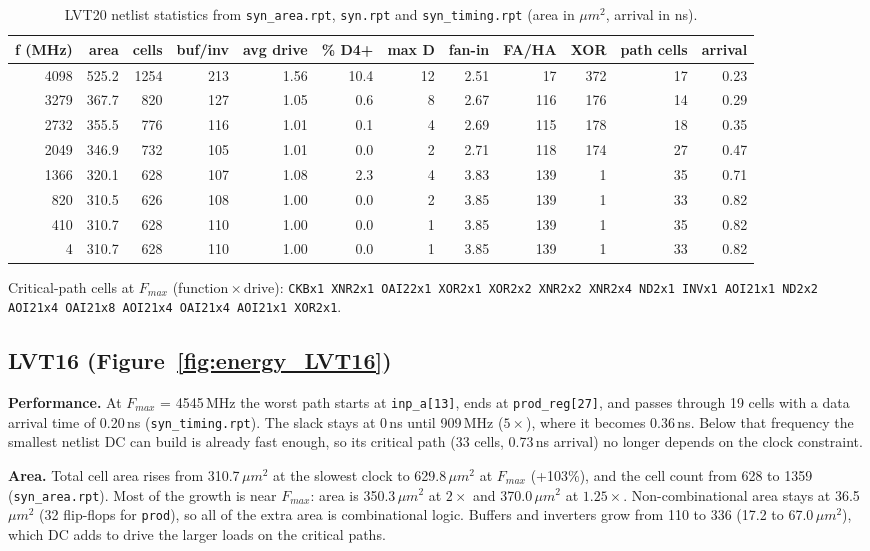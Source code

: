 \documentclass[11pt]{article}
\begin{document}
\begin{table}[H]
\begin{center}
\small
\begin{tabular}{r|r|r|r|r|r|r|r|r|r|r|r}
\hline
f (MHz) & area & cells & buf/inv & avg drive & \% D4+ & max D & fan-in & FA/HA & XOR & path cells & arrival \\
\hline
4098 & 525.2 & 1254 & 213 & 1.56 & 10.4 & 12 & 2.51 & 17 & 372 & 17 & 0.23 \\
3279 & 367.7 & 820 & 127 & 1.05 & 0.6 & 8 & 2.67 & 116 & 176 & 14 & 0.29 \\
2732 & 355.5 & 776 & 116 & 1.01 & 0.1 & 4 & 2.69 & 115 & 178 & 18 & 0.35 \\
2049 & 346.9 & 732 & 105 & 1.01 & 0.0 & 2 & 2.71 & 118 & 174 & 27 & 0.47 \\
1366 & 320.1 & 628 & 107 & 1.08 & 2.3 & 4 & 3.83 & 139 & 1 & 35 & 0.71 \\
820 & 310.5 & 626 & 108 & 1.00 & 0.0 & 2 & 3.85 & 139 & 1 & 33 & 0.82 \\
410 & 310.7 & 628 & 110 & 1.00 & 0.0 & 1 & 3.85 & 139 & 1 & 35 & 0.82 \\
4 & 310.7 & 628 & 110 & 1.00 & 0.0 & 1 & 3.85 & 139 & 1 & 33 & 0.82 \\
\hline
\end{tabular}
\end{center}
\caption{LVT20 netlist statistics from \texttt{syn\_area.rpt}, \texttt{syn.rpt} and \texttt{syn\_timing.rpt} (area in $\mu m^2$, arrival in ns).}
\end{table}
Critical-path cells at $F_{max}$ (function\,$\times$\,drive): \texttt{CKBx1 XNR2x1 OAI22x1 XOR2x1 XOR2x2 XNR2x2 XNR2x4 ND2x1 INVx1 AOI21x1 ND2x2 AOI21x4 OAI21x8 AOI21x4 OAI21x4 AOI21x1 XOR2x1}.

\subsection*{LVT16 (Figure~\ref{fig:energy_LVT16})}

\textbf{Performance.} At $F_{max}$ = 4545\,MHz the worst path starts at \texttt{inp\_a[13]}, ends at \texttt{prod\_reg[27]}, and passes through 19 cells with a data arrival time of 0.20\,ns (\texttt{syn\_timing.rpt}). The slack stays at 0\,ns until 909\,MHz ($5\times$), where it becomes 0.36\,ns. Below that frequency the smallest netlist DC can build is already fast enough, so its critical path (33 cells, 0.73\,ns arrival) no longer depends on the clock constraint.

\textbf{Area.} Total cell area rises from 310.7\,$\mu m^2$ at the slowest clock to 629.8\,$\mu m^2$ at $F_{max}$ (+103\%), and the cell count from 628 to 1359 (\texttt{syn\_area.rpt}). Most of the growth is near $F_{max}$: area is 350.3\,$\mu m^2$ at $2\times$ and 370.0\,$\mu m^2$ at $1.25\times$. Non-combinational area stays at 36.5\,$\mu m^2$ (32 flip-flops for \texttt{prod}), so all of the extra area is combinational logic. Buffers and inverters grow from 110 to 336 (17.2 to 67.0\,$\mu m^2$), which DC adds to drive the larger loads on the critical paths.
\end{document}
